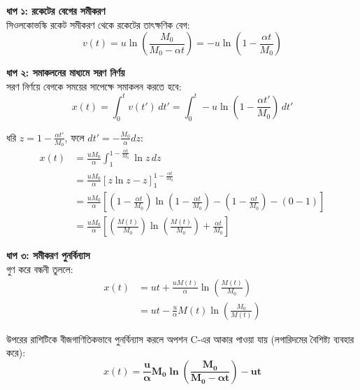 \documentclass[12pt, a4paper]{article}
\begin{document}
\begin{tcolorbox}[solutionbox={সমাধান (Solution)}]
    \noindent
    \textbf{ধাপ ১: রকেটের বেগের সমীকরণ} \\
    সিওলকোভস্কি রকেট সমীকরণ থেকে রকেটের তাৎক্ষণিক বেগ:
    \[ v(t) = u \ln\left(\frac{M_0}{M_0 - \alpha t}\right) = -u \ln\left(1 - \frac{\alpha t}{M_0}\right) \]
    
    \vspace{0.5em}
    \noindent\textbf{ধাপ ২: সমাকলনের মাধ্যমে সরণ নির্ণয়} \\
    সরণ নির্ণয়ে বেগকে সময়ের সাপেক্ষে সমাকলন করতে হবে:
    \[ x(t) = \int_0^t v(t') \, dt' = \int_0^t -u \ln\left(1 - \frac{\alpha t'}{M_0}\right) \, dt' \]
    
    ধরি $z = 1 - \frac{\alpha t'}{M_0}$, ফলে $dt' = -\frac{M_0}{\alpha} dz$:
    \begin{align*}
        x(t) &= \frac{u M_0}{\alpha} \int_{1}^{1 - \frac{\alpha t}{M_0}} \ln z \, dz \\
             &= \frac{u M_0}{\alpha} \left[ z \ln z - z \right]_{1}^{1 - \frac{\alpha t}{M_0}} \\
             &= \frac{u M_0}{\alpha} \left[ \left(1 - \frac{\alpha t}{M_0}\right) \ln\left(1 - \frac{\alpha t}{M_0}\right) - \left(1 - \frac{\alpha t}{M_0}\right) - (0 - 1) \right] \\
             &= \frac{u M_0}{\alpha} \left[ \left(\frac{M(t)}{M_0}\right) \ln\left(\frac{M(t)}{M_0}\right) + \frac{\alpha t}{M_0} \right]
    \end{align*}
    
    \vspace{0.5em}
    \noindent\textbf{ধাপ ৩: সমীকরণ পুনর্বিন্যাস} \\
    গুণ করে বন্ধনী তুললে:
    \begin{align*}
        x(t) &= u t + \frac{u M(t)}{\alpha} \ln\left(\frac{M(t)}{M_0}\right) \\
             &= u t - \frac{u}{\alpha} M(t) \ln\left(\frac{M_0}{M(t)}\right)
    \end{align*}
    
    উপরের রাশিটিকে বীজগাণিতিকভাবে পুনর্বিন্যাস করলে অপশন C-এর আকার পাওয়া যায় (লগারিদমের বৈশিষ্ট্য ব্যবহার করে):
    \[ x(t) = \mathbf{\frac{u}{\alpha} M_0 \ln\left(\frac{M_0}{M_0 - \alpha t}\right) - u t} \]
\end{tcolorbox}

\newpage
\end{document}
